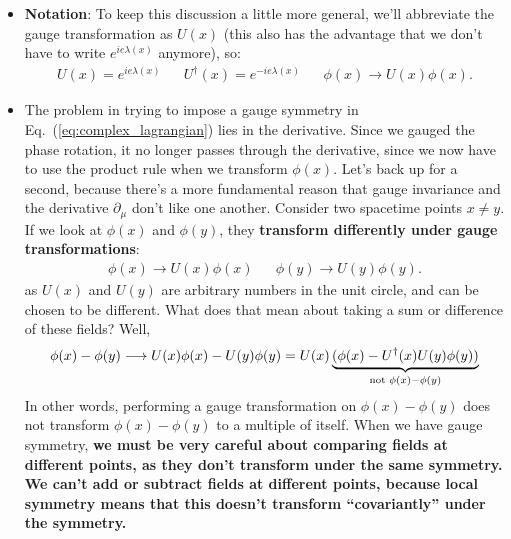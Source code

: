 \documentclass[12pt, oneside]{article}   	%
\theoremstyle{definition}
\begin{document}
\begin{itemize}
	In the more immediate case, gauge theories allow us to couple massless vector\footnote{By ``vector'', we mean a 4-vector field $A_\mu(x)$.} bosons to other fields. To study QED, that's exactly what we need! The photon is a massless vector boson, and the structure that we get from coupling it to another field is exactly the structure of a gauge theory. 
	
	\item \textbf{Notation}: To keep this discussion a little more general, we'll abbreviate the gauge transformation as $U(x)$ (this also has the advantage that we don't have to write $e^{ie\lambda(x)}$ anymore), so:
	\begin{align}
		U(x) = e^{i e \lambda(x)} && U^\dagger(x) = e^{-i e \lambda(x)} && \phi(x)\longrightarrow U(x) \phi(x) .
	\end{align}
	
	\item The problem in trying to impose a gauge symmetry in Eq.~(\ref{eq:complex_lagrangian}) lies in the derivative. Since we gauged the phase rotation, it no longer passes through the derivative, since we now have to use the product rule when we transform $\phi(x)$. Let's back up for a second, because there's a more fundamental reason that gauge invariance and the derivative $\partial_\mu$ don't like one another. Consider two spacetime points $x\neq y$. If we look at $\phi(x)$ and $\phi(y)$, they \textbf{transform differently under gauge transformations}:
	\begin{align}
		\phi(x)\longrightarrow U(x) \phi(x) && \phi(y)\longrightarrow U(y)\phi(y).
	\end{align}
	as $U(x)$ and $U(y)$ are arbitrary numbers in the unit circle, and can be chosen to be different. What does that mean about taking a sum or difference of these fields? Well,
	\begin{equation}
		\phi(x) - \phi(y)\longrightarrow U(x) \phi(x) - U(y) \phi(y) = U(x) \underbrace{(\phi(x) - U^\dagger(x) U(y) \phi(y))}_{\textnormal{not }\phi(x) - \phi(y)}
	\end{equation}
	In other words, performing a gauge transformation on $\phi(x) - \phi(y)$ does not transform $\phi(x) - \phi(y)$ to a multiple of itself. When we have gauge symmetry, \textbf{we must be very careful about comparing fields at different points, as they don't transform under the same symmetry. We can't add or subtract fields at different points, because local symmetry means that this doesn't transform ``covariantly'' under the symmetry.} 


\end{itemize}
\end{document}
